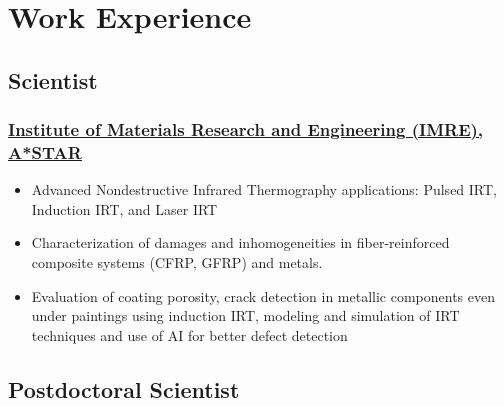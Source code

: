 \documentclass{my_cv}%
\begin{document}
\section{Work Experience}
\vspace{1.0em}
\subsection{Scientist}
\subsubsection{\href{https://www.a-star.edu.sg/imre}{Institute of Materials Research and Engineering (IMRE), A*STAR}}
\begin{itemize}[leftmargin=0.15in]
\setlength\itemsep{-0.1em}
\color{mygray}
\item Advanced Nondestructive Infrared Thermography applications: Pulsed IRT, Induction IRT, and Laser IRT
\item Characterization of damages and inhomogeneities in fiber-reinforced composite systems (CFRP, GFRP) and metals.
\item Evaluation of coating porosity, crack detection in metallic components even under paintings using induction IRT, modeling and simulation of IRT techniques and use of AI for better defect detection 
\end{itemize}%
{\color{mygray1} \hdashrule[0.1ex]{18.8cm}{0.2mm}{1mm}}
\subsection{Postdoctoral Scientist}
\end{document}
